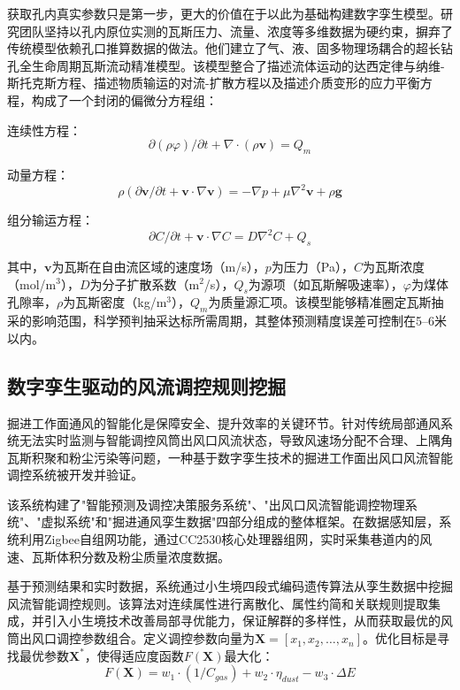 \documentclass[twocolumn,a4paper]{ctexart}
\numberwithin{equation}{section}
\begin{document}
获取孔内真实参数只是第一步，更大的价值在于以此为基础构建数字孪生模型。研究团队坚持以孔内原位实测的瓦斯压力、流量、浓度等多维数据为硬约束，摒弃了传统模型依赖孔口推算数据的做法。他们建立了气、液、固多物理场耦合的超长钻孔全生命周期瓦斯流动精准模型。该模型整合了描述流体运动的达西定律与纳维-斯托克斯方程、描述物质输运的对流-扩散方程以及描述介质变形的应力平衡方程，构成了一个封闭的偏微分方程组：

连续性方程：
\begin{equation}
\partial(\rho\varphi)/\partial t + \nabla \cdot (\rho \bm{v}) = Q_m
\end{equation}

动量方程：
\begin{equation}
\rho(\partial \bm{v}/\partial t + \bm{v} \cdot \nabla \bm{v}) = -\nabla p + \mu \nabla^2 \bm{v} + \rho \bm{g}
\end{equation}

组分输运方程：
\begin{equation}
\partial C/\partial t + \bm{v} \cdot \nabla C = D \nabla^2 C + Q_s
\end{equation}

其中，$\bm{v}$为瓦斯在自由流区域的速度场（m/s），$p$为压力（Pa），$C$为瓦斯浓度（mol/m$^3$），$D$为分子扩散系数（m$^2$/s），$Q_s$为源项（如瓦斯解吸速率），$\varphi$为煤体孔隙率，$\rho$为瓦斯密度（kg/m$^3$），$Q_m$为质量源汇项。该模型能够精准圈定瓦斯抽采的影响范围，科学预判抽采达标所需周期，其整体预测精度误差可控制在5--6米以内。

\subsection{数字孪生驱动的风流调控规则挖掘}

掘进工作面通风的智能化是保障安全、提升效率的关键环节。针对传统局部通风系统无法实时监测与智能调控风筒出风口风流状态，导致风速场分配不合理、上隅角瓦斯积聚和粉尘污染等问题，一种基于数字孪生技术的掘进工作面出风口风流智能调控系统被开发并验证。

该系统构建了"智能预测及调控决策服务系统"、"出风口风流智能调控物理系统"、"虚拟系统"和"掘进通风孪生数据"四部分组成的整体框架。在数据感知层，系统利用Zigbee自组网功能，通过CC2530核心处理器组网，实时采集巷道内的风速、瓦斯体积分数及粉尘质量浓度数据。

基于预测结果和实时数据，系统通过小生境四段式编码遗传算法从孪生数据中挖掘风流智能调控规则。该算法对连续属性进行离散化、属性约简和关联规则提取集成，并引入小生境技术改善局部寻优能力，保证解群的多样性，从而获取最优的风筒出风口调控参数组合。定义调控参数向量为$\bm{X}=[x_1,x_2,\ldots,x_n]$。优化目标是寻找最优参数$\bm{X}^*$，使得适应度函数$F(\bm{X})$最大化：
\begin{equation}
F(\bm{X}) = w_1 \cdot (1/C_{gas}) + w_2 \cdot \eta_{dust} - w_3 \cdot \Delta E
\end{equation}
\end{document}

